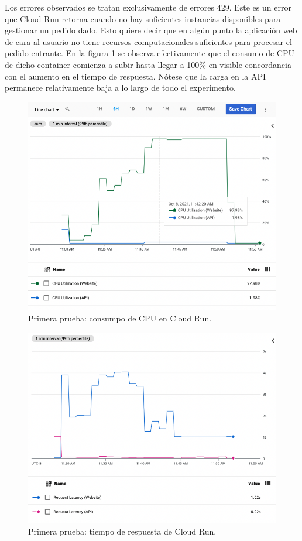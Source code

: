 \documentclass[11pt]{scrartcl}
\begin{document}
Los errores observados se tratan exclusivamente de errores 429. Este es un error que Cloud Run retorna cuando no hay suficientes instancias disponibles para gestionar un pedido dado. Esto quiere decir que en algún punto la aplicación web de cara al usuario no tiene recursos computacionales suficientes para procesar el pedido entrante. En la figura \ref{fig:test-1-cloud-run-cpu} se observa efectivamente que el consumo de CPU de dicho container comienza a subir hasta llegar a 100\% en visible concordancia con el aumento en el tiempo de respuesta. Nótese que la carga en la API permanece relativamente baja a lo largo de todo el experimento.

\begin{figure}[!b]
\centering
\includegraphics[scale=0.4]{img/cloud-run-cpu}
\caption{Primera prueba: consumpo de CPU en Cloud Run.}
\label{fig:test-1-cloud-run-cpu}
\end{figure}

\begin{figure}
\centering
\includegraphics[scale=0.4]{img/cloud-run-request-latency}
\caption{Primera prueba: tiempo de respuesta de Cloud Run.}
\label{fig:test-1-cloud-run-response-time}
\end{figure}
\end{document}
